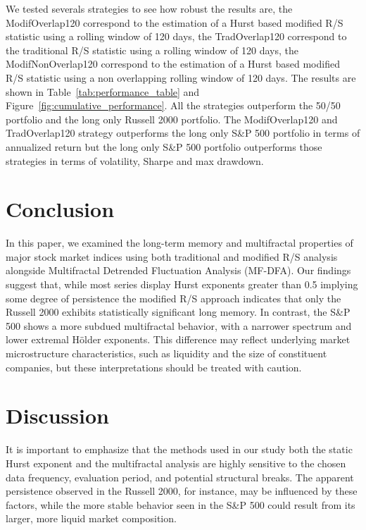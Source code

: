 \documentclass[11pt]{extarticle}
\begin{document}
We tested severals strategies to see how robust the results are, the ModifOverlap120 correspond to the estimation of a
Hurst based modified R/S statistic using a rolling window of 120 days, the TradOverlap120 correspond to the
traditional R/S statistic using a rolling window of 120 days, the ModifNonOverlap120 correspond to the estimation of a
Hurst based modified R/S statistic using a non overlapping rolling window of 120 days.
The results are shown in Table~\ref{tab:performance_table} and Figure~\ref{fig:cumulative_performance}.
All the strategies outperform the 50/50 portfolio and the long only Russell 2000 portfolio.
The ModifOverlap120 and TradOverlap120 strategy outperforms the long only S\&P 500 portfolio in terms of annualized return
but the long only S\&P 500 portfolio outperforms those strategies in terms of volatility, Sharpe and max drawdown.


\section{Conclusion}

In this paper, we examined the long-term memory and multifractal properties of major stock market indices using both
traditional and modified R/S analysis alongside Multifractal Detrended Fluctuation Analysis (MF-DFA). Our findings
suggest that, while most series display Hurst exponents greater than 0.5 implying some degree of persistence the
modified R/S approach indicates that only the Russell 2000 exhibits statistically significant long memory.
In contrast, the S\&P 500 shows a more subdued multifractal behavior, with a narrower spectrum and lower extremal Hölder
exponents. This difference may reflect underlying market microstructure characteristics, such as liquidity and the size
of constituent companies, but these interpretations should be treated with caution.

\section{Discussion}

It is important to emphasize that the methods used in our study both the static Hurst exponent and the multifractal
analysis are highly sensitive to the chosen data frequency, evaluation period, and potential structural breaks. The
apparent persistence observed in the Russell 2000, for instance, may be influenced by these factors, while the more
stable behavior seen in the S\&P 500 could result from its larger, more liquid market composition.
\end{document}
